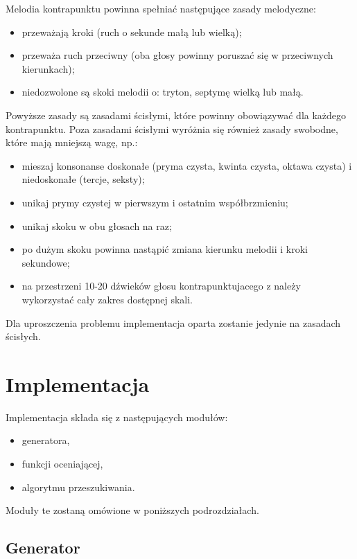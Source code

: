 \documentclass{article}
\begin{document}
Melodia kontrapunktu powinna spełniać następujące zasady melodyczne:

\begin{itemize}
\item przeważają kroki (ruch o sekunde małą lub wielką);
\item przeważa ruch przeciwny (oba głosy powinny poruszać się w przeciwnych kierunkach);
\item niedozwolone są skoki melodii o: tryton, septymę wielką lub małą.
\end{itemize}

Powyższe zasady są zasadami ścisłymi, które powinny obowiązywać dla każdego kontrapunktu. Poza zasadami ścisłymi wyróżnia się również zasady swobodne, które mają mniejszą wagę, np.:

\begin{itemize}
\item mieszaj konsonanse doskonałe (pryma czysta, kwinta czysta, oktawa czysta) i niedoskonałe (tercje, seksty);
\item unikaj prymy czystej w pierwszym i ostatnim współbrzmieniu;
\item unikaj skoku w obu głosach na raz;
\item po dużym skoku powinna nastąpić zmiana kierunku melodii i kroki sekundowe;
\item na przestrzeni 10-20 dźwieków głosu kontrapunktujacego z należy wykorzystać cały zakres dostępnej skali.
\end{itemize}

Dla uproszczenia problemu implementacja oparta zostanie jedynie na zasadach ścisłych.

\section{Implementacja}

Implementacja składa się z następujących modułów:
\begin{itemize}
\item generatora,
\item funkcji oceniającej,
\item algorytmu przeszukiwania.
\end{itemize}

Moduły te zostaną omówione w poniższych podrozdziałach.

\subsection{Generator}
\end{document}
